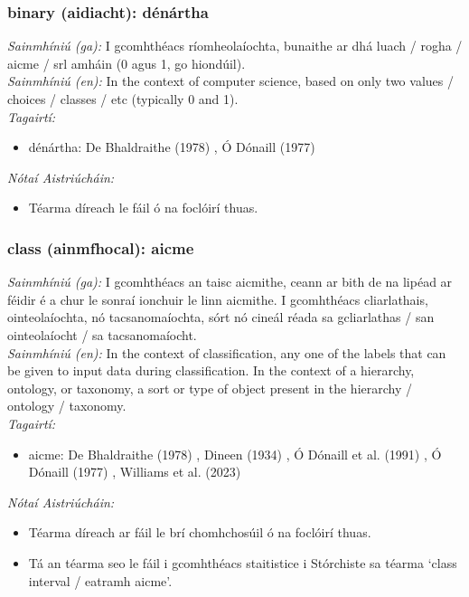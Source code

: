 \subsubsection*{binary (aidiacht): dénártha}
 \noindent \textit{Sainmhíniú (ga):} I gcomhthéacs ríomheolaíochta, bunaithe ar dhá luach / rogha / aicme / srl amháin (0 agus 1, go hiondúil).
\\
 \noindent \textit{Sainmhíniú (en):} In the context of computer science, based on only two values / choices / classes / etc (typically 0 and 1).
\\
 \noindent \textit{Tagairtí:}
\begin{itemize}
	\item dénártha: De Bhaldraithe (1978) \cite{de-bhaldraithe}, Ó Dónaill (1977) \cite{odonaill}
\end{itemize}

 \noindent \textit{Nótaí Aistriúcháin:}
\begin{itemize}
	\item Téarma díreach le fáil ó na foclóirí thuas.
\end{itemize}


\subsubsection*{class (ainmfhocal): aicme}
 \noindent \textit{Sainmhíniú (ga):} I gcomhthéacs an taisc aicmithe, ceann ar bith de na lipéad ar féidir é a chur le sonraí ionchuir le linn aicmithe. I gcomhthéacs cliarlathais, ointeolaíochta, nó tacsanomaíochta, sórt nó cineál réada sa gcliarlathas / san ointeolaíocht / sa tacsanomaíocht.
\\
 \noindent \textit{Sainmhíniú (en):} In the context of classification, any one of the labels that can be given to input data during classification. In the context of a hierarchy, ontology, or taxonomy, a sort or type of object present in the hierarchy / ontology / taxonomy.
\\
 \noindent \textit{Tagairtí:}
\begin{itemize}
	\item aicme: De Bhaldraithe (1978) \cite{de-bhaldraithe}, Dineen (1934) \cite{dineen}, Ó Dónaill et al. (1991) \cite{focloir-beag}, Ó Dónaill (1977) \cite{odonaill}, Williams et al. (2023) \cite{storchiste}
\end{itemize}

 \noindent \textit{Nótaí Aistriúcháin:}
\begin{itemize}
	\item Téarma díreach ar fáil le brí chomhchosúil ó na foclóirí thuas.
	\item Tá an téarma seo le fáil i gcomhthéacs staitistice i Stórchiste sa téarma `class interval / eatramh aicme'.
\end{itemize}


